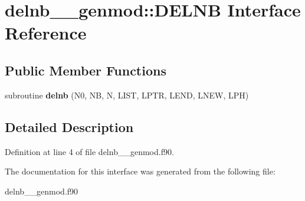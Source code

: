\hypertarget{interfacedelnb____genmod_1_1_d_e_l_n_b}{\section{delnb\+\_\+\+\_\+genmod\+:\+:D\+E\+L\+N\+B Interface Reference}
\label{interfacedelnb____genmod_1_1_d_e_l_n_b}
}
\subsection*{Public Member Functions}
\begin{DoxyCompactItemize}
\item 
\hypertarget{interfacedelnb____genmod_1_1_d_e_l_n_b_ac834fae53dc46917152f1ec8b8d3ab38}{subroutine {\bfseries delnb} (N0, N\+B, N, L\+I\+S\+T, L\+P\+T\+R, L\+E\+N\+D, L\+N\+E\+W, L\+P\+H)}\label{interfacedelnb____genmod_1_1_d_e_l_n_b_ac834fae53dc46917152f1ec8b8d3ab38}

\end{DoxyCompactItemize}


\subsection{Detailed Description}


Definition at line 4 of file delnb\+\_\+\+\_\+genmod.\+f90.



The documentation for this interface was generated from the following file\+:\begin{DoxyCompactItemize}
\item 
delnb\+\_\+\+\_\+genmod.\+f90\end{DoxyCompactItemize}
